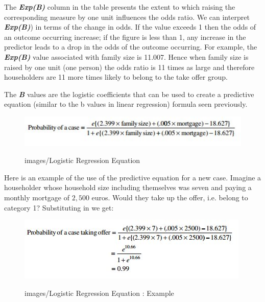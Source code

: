 \documentclass[a4paper,12pt]{article}
\begin{document}
The \textbf{\textit{Exp(B)}} column in the table presents the extent to which raising the corresponding measure by one unit influences the odds ratio. We can interpret \textbf{\textit{Exp(B)}}) in
terms of the change in odds. If the value exceeds 1 then the odds of an outcome occurring increase; if the figure is less than 1, any increase in the predictor leads to a drop in
the odds of the outcome occurring. For example, the \textbf{\textit{Exp(B)}} value associated with
family size is 11.007. Hence when family size is raised by one unit (one person) the
odds ratio is 11 times as large and therefore householders are 11 more times likely to
belong to the take offer group.

The \textbf{\textit{B}} values are the logistic coefficients that can be used to create a predictive
equation (similar to the b values in linear regression) formula seen previously.
\begin{figure}
\begin{center}
  \includegraphics[scale=0.75]{images/Logistic11.jpg}\\
  \caption{images/Logistic Regression Equation}
\end{center}
\end{figure}

Here is an example of the use of the predictive equation for a new case. Imagine a
householder whose household size including themselves was seven and paying
a monthly mortgage of $2,500$ euros. Would they take up the offer, i.e. belong to category 1?
Substituting in we get:
\begin{figure}
\begin{center}
  \includegraphics[scale=0.75]{images/Logistic12.jpg}\\
  \caption{images/Logistic Regression Equation : Example}
\end{center}
\end{figure}
\end{document}
